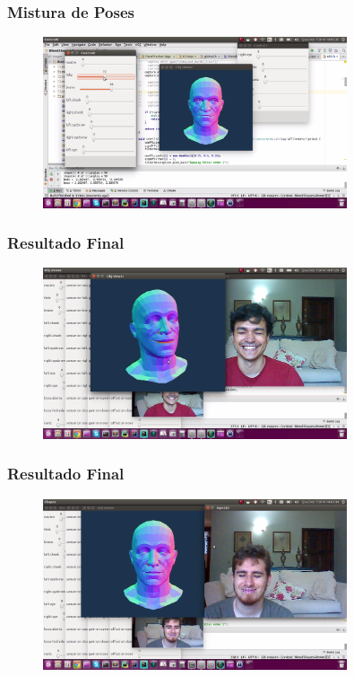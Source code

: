 \documentclass[brazil]{beamer}
\begin{document}
\begin{frame}
\frametitle{Mistura de Poses}

	\begin{figure}
        \centering
        \includegraphics[width = 0.8\textwidth, keepaspectratio]{./img/blend-demo.png}
      \end{figure}
 
\end{frame}

\begin{frame}
\frametitle{Resultado Final} 

	\begin{figure}
        \centering
        \includegraphics[width = 0.8\textwidth, keepaspectratio]{./img/result-0.png}
      \end{figure}

\end{frame}


\begin{frame}
\frametitle{Resultado Final}

	\begin{figure}
        \centering
        \includegraphics[width = 0.8\textwidth, keepaspectratio]{./img/result-1.png}
      \end{figure}
\end{frame}
\end{document}
